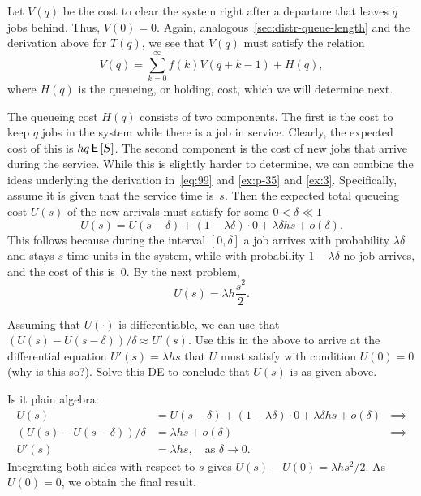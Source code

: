 \documentclass[companion]{subfiles}
\begin{document}
Let $V(q)$ be the cost to clear the system right after a departure that leaves $q$ jobs behind.
Thus, $V(0)=0$.
Again, analogous~\cref{sec:distr-queue-length} and the derivation above for $T(q)$, we see that $V(q)$ must satisfy the relation
\begin{equation}
  \label{eq:98}
  V(q) = \sum_{k=0}^\infty f(k) V(q+k-1) + H(q), 
\end{equation}
where $H(q)$ is the queueing, or holding, cost, which we will determine next.

The queueing cost $H(q)$ consists of two components.
The first is the cost to keep $q$ jobs in the system while there is a job in service.
Clearly, the expected cost of this is $h q \,\mathsf{E}\left[S\right]$.
The second component is the cost of new jobs that arrive during the service.
While this is slightly harder to determine, we can combine the ideas underlying the derivation in~\cref{eq:99} and \cref{ex:p-35}  and \cref{ex:3}.
Specifically, assume it is given that the service time is~$s$.
Then the expected total queueing cost $U(s)$ of the new arrivals must satisfy for some $0<\delta\ll 1$
\begin{equation*}
  U(s) = U(s-\delta) + (1-\lambda \delta)\cdot 0 + \lambda \delta h s + o(\delta).
\end{equation*}
This follows because during the interval $[0,\delta]$ a job arrives with probability $\lambda \delta$ and stays $s$ time units in the system, while with probability $1-\lambda \delta$ no job arrives, and the cost of this is~$0$.
By the next problem, 
\begin{equation*}
  U(s) = \lambda h \frac{s^2}2. 
\end{equation*}

\begin{exercise}
Assuming that $U(\cdot)$ is differentiable, we can use that $(U(s) - U(s-\delta))/\delta \approx U'(s)$.
Use this in the above to arrive at the differential equation $U'(s) = \lambda h s$ that $U$ must satisfy with condition $U(0)=0$ (why is this so?).
Solve this DE to conclude that $U(s)$ is as given above. 
\begin{solution}
Is it plain algebra:
\begin{align*}
  U(s)&=  U(s-\delta) + (1-\lambda \delta)\cdot 0 + \lambda \delta h s + o(\delta) &\implies\\
  (U(s) -U(s-\delta))/\delta &= \lambda h s + o(\delta) & \implies \\
  U'(s)&= \lambda h s, \quad\text{as } \delta \to 0.
\end{align*}
Integrating  both sides with respect to $s$ gives $U(s) - U(0) = \lambda h s^2/2$. As $U(0)=0$, we obtain the final result.
\end{solution}
\end{exercise}
\end{document}
